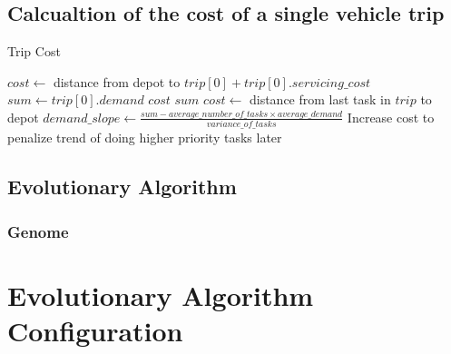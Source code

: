 
\section{Calcualtion of the cost of a single vehicle trip} %
\label{sec:calcualtion_of_the_cost_of_a_single_vehicle_trip}

\begin{algorithm}
\caption{Trip Cost}\label{trip-cost-pseudocode}
\begin{algorithmic}[1]

	\State $cost \leftarrow$ distance from depot to $trip[0] + trip[0].servicing\_cost$
	\State $sum \leftarrow trip[0].demand$
		\State $cost$
		\State $sum$
	\EndFor
	\State $cost \leftarrow$ distance from last task in $trip$ to depot
	\State $demand\_slope \leftarrow \frac{sum - average\_number\_of\_tasks \times average\_demand}{variance\_of\_tasks}$
		\State Increase cost to penalize trend of doing higher priority tasks later
	\EndIf
\EndProcedure

\end{algorithmic}
\end{algorithm}



\section{Evolutionary Algorithm} %
\label{sec:evolutionary_algorithm}

\subsection{Genome} %
\label{sub:genome}



\chapter{Evolutionary Algorithm Configuration} %
\label{cha:evolutionary_algorithm_configuration}

